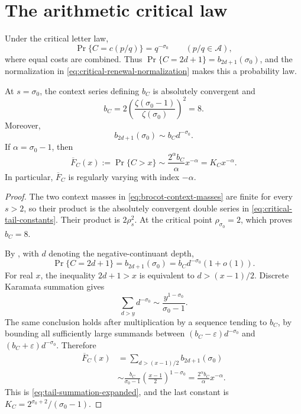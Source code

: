 \section{The arithmetic critical law}\label{sec:arithmetic-critical}

Under the critical letter law,
\[
 \Pr\{C=c(p/q)\}=q^{-\sigma_0}
 \qquad(p/q\in\mathcal A),
\]
where equal costs are combined.  Thus
\(\Pr\{C=2d+1\}=b_{2d+1}(\sigma_0)\), and the normalization in
\eqref{eq:critical-renewal-normalization} makes this a probability law.

\begin{lemma}
\label{lem:critical-tail-summation}
At \(s=\sigma_0\), the context series defining \(b_C\) is absolutely
convergent and
\[
 b_C=2\left(\frac{\zeta(\sigma_0-1)}{\zeta(\sigma_0)}\right)^2=8.
\]
Moreover,
\begin{equation}
 b_{2d+1}(\sigma_0)\sim b_Cd^{-\sigma_0}.
 \label{eq:critical-letter-local-tail}
\end{equation}
If \(\alpha=\sigma_0-1\), then
\begin{equation}
 \overline F_C(x):=\Pr\{C>x\}
 \sim \frac{2^\alpha b_C}{\alpha}x^{-\alpha}
 =K_Cx^{-\alpha}.
 \label{eq:tail-summation-expanded}
\end{equation}
In particular, \(\overline F_C\) is regularly varying with index
\(-\alpha\).
\end{lemma}

\begin{proof}
The two context masses in \eqref{eq:brocot-context-masses} are finite for
every \(s>2\), so their product is the absolutely convergent double series
in \eqref{eq:critical-tail-constants}.  Their product is \(2\rho_s^2\).
At the critical point \(\rho_{\sigma_0}=2\), which proves \(b_C=8\).

By , with \(d\) denoting the
negative-continuant depth,
\[
 \Pr\{C=2d+1\}=b_{2d+1}(\sigma_0)
 =b_Cd^{-\sigma_0}(1+o(1)).
\]
For real \(x\), the inequality \(2d+1>x\) is equivalent to
\(d>(x-1)/2\).  Discrete Karamata summation gives
\[
 \sum_{d>y}d^{-\sigma_0}
 \sim\frac{y^{1-\sigma_0}}{\sigma_0-1}.
\]
The same conclusion holds after multiplication by a sequence tending to
\(b_C\), by bounding all sufficiently large summands between
\((b_C-\varepsilon)d^{-\sigma_0}\) and
\((b_C+\varepsilon)d^{-\sigma_0}\).  Therefore
\begin{align*}
 \overline F_C(x)
 &=\sum_{d>(x-1)/2}b_{2d+1}(\sigma_0)\\
 &\sim\frac{b_C}{\sigma_0-1}
       \left(\frac{x-1}{2}\right)^{1-\sigma_0}
 =\frac{2^\alpha b_C}{\alpha}x^{-\alpha}.
\end{align*}
This is \eqref{eq:tail-summation-expanded}, and the last constant is
\(K_C=2^{\sigma_0+2}/(\sigma_0-1)\).
\end{proof}

